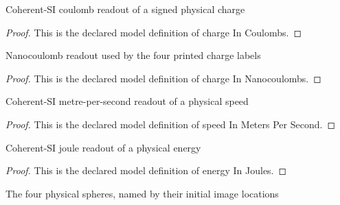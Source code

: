 \begin{definition}
  \label{def:physics:phyx-mini-0864:phyxminiproblems-problemphyxmini0864-chargeincoulombs}
  Coherent-SI coulomb readout of a signed physical charge
\end{definition}
\begin{proof}
  This is the declared model definition of charge In Coulombs.
\end{proof}
\begin{definition}
  \label{def:physics:phyx-mini-0864:phyxminiproblems-problemphyxmini0864-chargeinnanocoulombs}
  Nanocoulomb readout used by the four printed charge labels
\end{definition}
\begin{proof}
  This is the declared model definition of charge In Nanocoulombs.
\end{proof}
\begin{definition}
  \label{def:physics:phyx-mini-0864:phyxminiproblems-problemphyxmini0864-speedinmeterspersecond}
  Coherent-SI metre-per-second readout of a physical speed
\end{definition}
\begin{proof}
  This is the declared model definition of speed In Meters Per Second.
\end{proof}
\begin{definition}
  \label{def:physics:phyx-mini-0864:phyxminiproblems-problemphyxmini0864-energyinjoules}
  Coherent-SI joule readout of a physical energy
\end{definition}
\begin{proof}
  This is the declared model definition of energy In Joules.
\end{proof}
\begin{definition}
  \label{def:physics:phyx-mini-0864:phyxminiproblems-problemphyxmini0864-spherelabel}
  The four physical spheres, named by their initial image locations
\end{definition}
